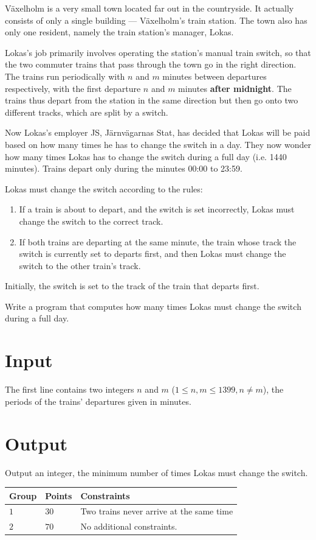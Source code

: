 Växelholm is a very small town located far out in the countryside. It actually consists of only
a single building --- Växelholm's train station. The town also has only one resident, namely the train station's
manager, Lokas. 

Lokas's job primarily involves operating the station's manual train switch, so that the two commuter trains
that pass through the town go in the right direction. The trains run periodically with $n$ and $m$ minutes
between departures respectively, with the first departure $n$ and $m$ minutes \textbf{after midnight}. The trains thus depart from the station
in the same direction but then go onto two different tracks, which are split by a switch.

Now Lokas's employer JS, Järnvägarnas Stat, has decided that Lokas will be paid based on how many
times he has to change the switch in a day. They now wonder how many times Lokas has to change the switch
during a full day (i.e. 1440 minutes). Trains depart only during the minutes 00:00 to 23:59. 

Lokas must change the switch according to the rules:
\begin{enumerate}
\item If a train is about to depart, and the switch is set incorrectly, Lokas must change the switch to the correct track.
\item If both trains are departing at the same minute, the train whose track the switch is currently set to departs first, and then Lokas must change the switch to the other train's track.
\end{enumerate}

Initially, the switch is set to the track of the train that departs first. 

Write a program that computes how many times Lokas must change the switch during a full day.

\section*{Input}
The first line contains two integers $n$ and $m$ ($1 \leq n, m \leq 1399, n \not= m$), the periods of the trains' departures given in minutes.

\section*{Output}
Output an integer, the minimum number of times Lokas must change the switch.

\noindent
\begin{tabular}{| l | l | p{12cm} |}
  \hline
  \textbf{Group} & \textbf{Points} & \textbf{Constraints} \\ \hline
  $1$    & $30$        & Two trains never arrive at the same time \\ \hline 
  $2$    & $70$        & No additional constraints. \\ \hline 
\end{tabular}
